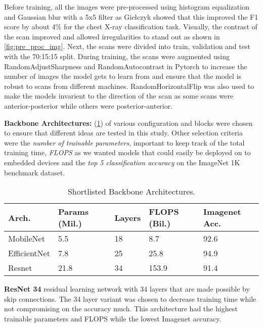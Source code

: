 \documentclass[10pt,twocolumn,letterpaper]{article}
\begin{document}
Before training, all the images were pre-processed using histogram equalization and Gaussian blur 
with a 5x5 filter as Giełczyk \etal \cite{gielczyk2022pre} showed that this improved the 
F1 score by about 4\% for the chest X-ray classification task. Visually, the contrast of the scan improved 
and allowed irregularities to stand out as shown in \cref{fig:pre_proc_img}. Next, the 
scans were divided into train, validation and test with the 70:15:15 split. 
During training, the scans were augmented using RandomAdjustSharpness and 
RandomAutocontrast in Pytorch \cite{transforms} to increase the number of images the 
model gets to learn from and ensure that the model is robust to scans from different machines.
RandomHorizontalFlip was also used to make the models invarient to the direction of the scan as 
some scans were anterior-posterior while others were posterior-anterior.

\textbf{Backbone Architectures:} (\cref{tab:selArch}) of various configuration and blocks were chosen 
to ensure that different ideas are tested in this study. 
Other selection criteria were the \textit{number of trainable parameters}, important to keep track of 
the total training time, \textit{FLOPS} as we wanted models that could easily be 
deployed on to embedded devices and the \textit{top 5 classification accuracy} on the ImageNet 
1K benchmark dataset.

\begin{table}
  \centering
  \begin{tabular}{p{1.7cm}|p{1cm}|p{1cm}|p{1cm}|p{1cm}}
  \toprule
  Arch. & Params (Mil.) & Layers & FLOPS (Bil.) & Imagenet Acc.\\
  \midrule
  MobileNet & 5.5 & 18 & 8.7 & 92.6\\
  \midrule
  EfficientNet & 7.8 & 25 & 25.8 & 94.9\\
  \midrule
  Resnet & 21.8 & 34 & 153.9 & 91.4\\
  \bottomrule
  \end{tabular}
  \caption{Shortlisted Backbone Architectures.}
  \label{tab:selArch}
\end{table}

\textbf{ResNet 34} residual learning network with 34 layers that are made possible by skip 
connections. The 34 layer variant was chosen to decrease training time while not compromising on 
the accuracy much. This architecture had the highest trainable parameters and FLOPS while the lowest 
Imagenet accuracy.
\cite{he2016deep}
\end{document}
